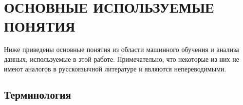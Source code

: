 \documentclass[14pt]{extarticle}
\begin{document}
\renewcommand{\contentsname}{\centering СОДЕРЖАНИЕ}
\newpage
\linespread{1}
\tableofcontents

\newpage

\section*{ОСНОВНЫЕ ИСПОЛЬЗУЕМЫЕ ПОНЯТИЯ}

Ниже приведены основные понятия из области машинного обучения и анализа данных, используемые в этой работе. Примечательно, что некоторые из них не имеют аналогов в русскоязычной литературе и являются непереводимыми. 

\subsection*{Терминология}
\end{document}

